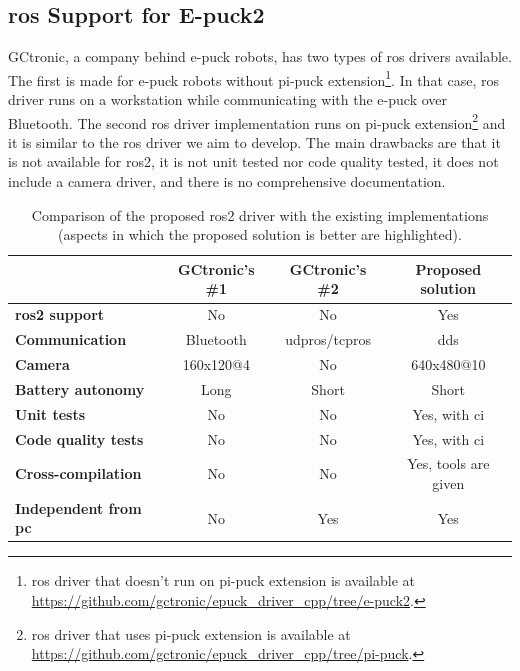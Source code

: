 \subsection{\ac{ros} Support for E-puck2}
GCtronic, a company behind e-puck robots, has two types of \ac{ros} drivers available.
The first is made for e-puck robots without pi-puck extension\footnote{\ac{ros} driver that doesn't run on pi-puck extension is available at \url{https://github.com/gctronic/epuck_driver_cpp/tree/e-puck2}.}.
In that case, \ac{ros} driver runs on a workstation while communicating with the e-puck over Bluetooth. The second \ac{ros} driver implementation runs on pi-puck extension\footnote{\ac{ros} driver that uses pi-puck extension is available at \url{https://github.com/gctronic/epuck_driver_cpp/tree/pi-puck}.} and it is similar to the \ac{ros} driver we aim to develop. The main drawbacks are that it is not available for \ac{ros2}, it is not unit tested nor code quality tested, it does not include a camera driver, and there is no comprehensive documentation.

\begin{table}[H]
    \begin{adjustwidth}{-1.5in}{-1.5in}
    \centering
    \begin{tabular}{|l|c|c|c|}
         \hline
         & \textbf{GCtronic's \#1} & \textbf{GCtronic's \#2} & \textbf{Proposed solution} \\
         \hline
         \rowcolor{lightgray} \textbf{\ac{ros2} support} & No & No & Yes \\
         \hline
         \rowcolor{lightgray} \textbf{Communication} & Bluetooth & \acs{udpros}/\acs{tcpros} & \ac{dds} \\
         \hline
         \rowcolor{lightgray} \textbf{Camera} & 160x120@4 & No & 640x480@10 \\
         \hline
         \textbf{Battery autonomy} & Long & Short & Short \\
         \hline
         \rowcolor{lightgray} \textbf{Unit tests} & No & No & Yes, with \ac{ci} \\
         \hline
         \rowcolor{lightgray} \textbf{Code quality tests} & No & No & Yes, with \ac{ci} \\
         \hline
         \rowcolor{lightgray} \textbf{Cross-compilation} & No & No & Yes, tools are given  \\
         \hline
         \rowcolor{lightgray} \textbf{Independent from \acs{pc}} & No & Yes & Yes  \\
         \hline
    \end{tabular}
    \end{adjustwidth}
    \caption[Comparison of the proposed \ac{ros} drive with the existing implementations]{Comparison of the proposed \ac{ros2} driver with the existing implementations (aspects in which the proposed solution is better are highlighted).}
    \label{tab:background:epuck_ros}
\end{table}

